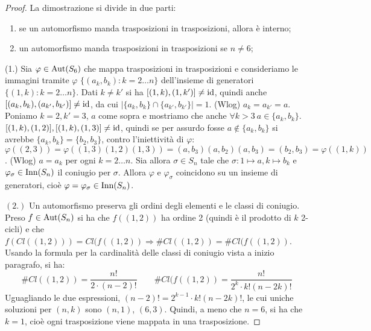 \begin{proof}
    La dimostrazione si divide in due parti: 
    \begin{enumerate}
    \item se un automorfismo manda trasposizioni in trasposizioni, allora è interno;
    \item un automorfismo manda trasposizioni in trasposizioni se $n \neq 6$;
    \end{enumerate}
    (1.) Sia $\varphi \in \text{Aut}(S_6)$ che mappa trasposizioni in trasposizioni e consideriamo le immagini tramite $\varphi$ $\{ (a_k,b_k) : k = 2 \dots n \}$ dell'insieme di generatori $\{ (1,k) : k = 2 \dots n \}$. Dati $k \neq k'$ si ha $[(1, k), (1, k')] \neq \text{id}$, quindi anche $[(a_k,b_k),(a_{k'},b_{k'})] \neq \text{id}$, da cui $\lvert \{a_k,b_k\} \cap \{a_{k'},b_{k'}\} \rvert = 1$. (Wlog) $a_k = a_{k'} = a$. Poniamo $k=2,k'=3$, $a$ come sopra e mostriamo che anche $\forall k > 3 \ a \in \{a_k, b_k\}$. $[(1,k),(1,2)],[(1,k),(1,3)] \neq \text{id}$, quindi se per assurdo fosse $a \notin \{a_k,b_k\}$ si avrebbe $\{a_k,b_k\} = \{b_2,b_3\}$, contro l'iniettività di $\varphi$: $\varphi((2,3)) = \varphi((1,3)(1,2)(1,3)) = (a,b_3)(a,b_2)(a,b_3) = (b_2,b_3) = \varphi((1,k))$. (Wlog) $a = a_k$ per ogni $k = 2\dots n$. Sia allora $\sigma \in S_n$ tale che $\sigma: 1 \mapsto a, k \mapsto b_k$ e $\varphi_\sigma \in \text{Inn}(S_n)$ il coniugio per $\sigma$. Allora $\varphi$ e $\varphi_\sigma$ coincidono su un insieme di generatori, cioè $\varphi = \varphi_\sigma \in \text{Inn}(S_n)$.
    
    $(2.)$ Un automorfismo preserva gli ordini degli elementi e le classi di coniugio. Preso $f \in \text{Aut}(S_n)$ si ha che $f((1,2))$ ha ordine 2 (quindi è il prodotto di $k$ 2-cicli) e che $f(Cl((1,2))) = Cl(f((1,2)) \Rightarrow \#Cl((1,2)) = \#Cl(f((1,2))$. Usando la formula per la cardinalità delle classi di coniugio vista a inizio paragrafo, si ha:
    \[
    \#Cl((1,2)) = \frac{n!}{2\cdot (n-2)!}
    \qquad
    \#Cl(f((1,2)) = \frac{n!}{2^k\cdot k!(n-2k)!}
    \]
    Uguagliando le due espressioni, $(n-2)! = 2^{k-1}\cdot k!(n-2k)!$, le cui uniche soluzioni per $(n,k)$ sono $(n,1)$, $(6,3)$. Quindi, a meno che $n = 6$, si ha che $k = 1$, cioè ogni trasposizione viene mappata in una trasposizione.
\end{proof}

